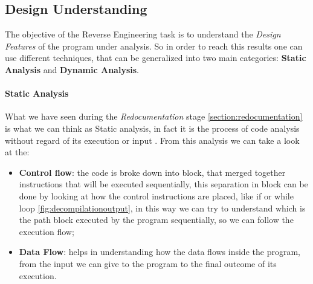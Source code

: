 \documentclass{article}
\begin{document}
\clearpage

\subsection{Design Understanding}
The objective of the Reverse Engineering task is to understand the \textit{Design Features} of the program under analysis. So in order to reach this results one can use different techniques, that can be generalized into two main categories: \textbf{Static Analysis} and \textbf{Dynamic Analysis}.

\paragraph{Static Analysis}
What we have seen during the \textit{Redocumentation} stage \ref{section:redocumentation} is what we can think as Static analysis, in fact it is the process of code analysis without regard of its execution or input \citep{LessonReverse}.
From this analysis we can take a look at the:
\begin{itemize}
    \item \textbf{Control flow}: the code is broke down into block, that merged together instructions that will be executed sequentially, this separation in block can be done by looking at how the control instructions are placed, like if or while loop \ref{fig:decompilationoutput}, in this way we can try to understand which is the path block executed by the program sequentially, so we can follow the execution flow;
    \item \textbf{Data Flow}: helps in understanding how the data flows inside the program, from the input we can give to the program to the final outcome of its execution.
\end{itemize}
\end{document}
